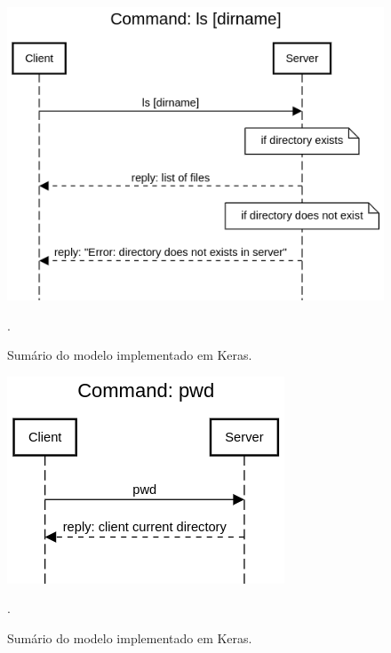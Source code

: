 \documentclass[conference]{IEEEtran}
\begin{document}
\begin{figure}[htbp]
\centering
\centerline{\includegraphics[scale=0.4]{diagrams/Command_ls_dirname.png}}
\caption{Sumário do modelo implementado em Keras.}.
\label{summary}
\end{figure}

\begin{figure}[htbp]
\centering
\centerline{\includegraphics[scale=0.4]{diagrams/Command_pwd.png}}
\caption{Sumário do modelo implementado em Keras.}.
\label{summary}
\end{figure}
\end{document}
